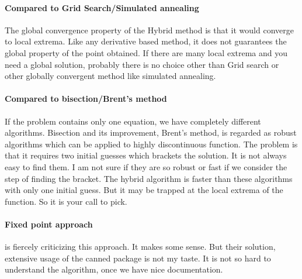 \documentclass[12pt]{article}
\begin{document}
\paragraph{Compared to Grid Search/Simulated annealing}
The global convergence property of the Hybrid method is that it would converge to local
extrema. Like any derivative based method, it does not guarantees the global property of the point
obtained. If there are many local extrema and you need a global solution, probably there is no
choice other than Grid search or other globally convergent method like simulated annealing.

\paragraph{Compared to bisection/Brent's method} If the problem contains only one equation, we
have completely different algorithms. Bisection and its improvement, Brent's method, is regarded
as robust algorithms which can be applied to highly discontinuous function. The problem is that it
requires two initial guesses which brackets the solution. It is not always easy to find them. I am
not sure if they are so robust or fast if we consider the step of finding the bracket.  The hybrid
algorithm is faster than these algorithms with only one initial guess. But it may be trapped at
the local extrema of the function. So it is your call to pick.

\paragraph{Fixed point approach} \cite{SuJudd2008} is fiercely criticizing this approach. It
makes some sense. But their solution, extensive usage of the canned package is not my taste. It is
not so hard to understand the algorithm, once we have nice documentation. 
\end{document}
